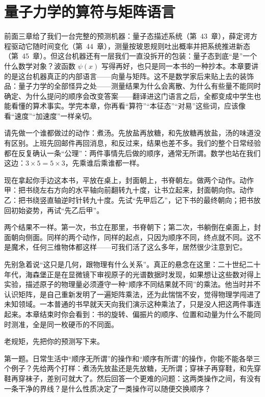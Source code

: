 \chapter{量子力学的算符与矩阵语言}

前面三章给了我们一台完整的预测机器：量子态描述系统（第~43~章），薛定谔方程驱动它随时间变化（第~44~章），测量按玻恩规则吐出概率并把系统推进新态（第~45~章）。但这台机器还有一层我们一直没拆开的包装：量子态到底“是”一个什么数学对象？波函数 $\psi(x)$ 写得再好，也只是同一本书的一种抄本。本章要讲的是这台机器真正的内部语言——向量与矩阵。这不是数学家后来贴上去的装饰品：量子力学的全部怪异之处——测量结果为什么会离散、为什么有些量不能同时确定、为什么提问的顺序会改变答案——翻译进这门语言之后，全都变成中学生也能看懂的算术事实。学完本章，你再看“算符”“本征态”“对易”这些词，应该像看“速度”“加速度”一样亲切。


请先做一个谁都做过的动作：煮汤。先放盐再放糖，和先放糖再放盐，汤的味道没有区别。上班先回邮件再回消息，和反过来，结果也差不多。我们的整个日常经验都在反复确认一条“公理”：两件事情先后做的顺序，通常无所谓。数学也站在我们这边：$3\times5=5\times3$，先乘谁后乘谁都一样。

现在拿起你手边这本书，平放在桌上，封面朝上，书脊朝左。做两个动作。动作甲：把书绕左右方向的水平轴向前翻转九十度，让书立起来，封面朝向你。动作乙：把书绕竖直轴逆时针转九十度。先试“先甲后乙”，记下书的最终朝向；把书放回初始姿势，再试“先乙后甲”。

两个结果不一样。第一次，书立在那里，书脊朝下；第二次，书躺倒在桌面上，封面朝向侧面。同样的两个动作，同样的起点，只因为顺序不同，终点就不同。这不是魔术，任何三维物体都这样——可我们活了这么多年，居然很少注意到它。

先别急着说“这只是几何，跟物理有什么关系”。真正的悬念在这里：二十世纪二十年代，海森堡正是在显微镜下审视原子的光谱数据时发现，如果想让这些数对得上实验，描述原子的物理量必须遵守一种“顺序不同结果就不同”的乘法。他当时并不认识矩阵，是自己重新发明了一遍矩阵乘法，还为此惴惴不安，觉得物理学闯进了未知领域。一本普通的书早就天天向我们演示这种乘法了，只是没人把这两件事连起来。本章结束时你会看到：书的旋转、偏振片的顺序、位置和动量为什么不能同时测准，全是同一枚硬币的不同面。


老规矩，先把你的预测写下来。

第一题。日常生活中“顺序无所谓”的操作和“顺序有所谓”的操作，你能不能各举三个例子？先给两个打样：煮汤先放盐还是先放糖，无所谓；穿袜子再穿鞋，和先穿鞋再穿袜子，差别可就大了。然后回答一个更难的问题：这两类操作之间，有没有一条干净的界线？是什么性质决定了一类操作可以随便交换顺序？

